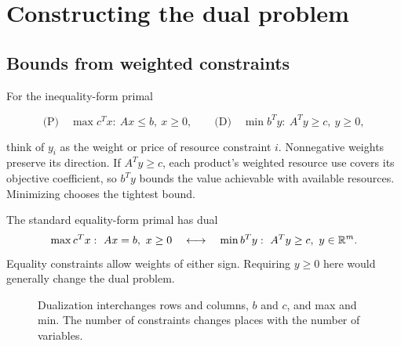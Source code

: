 \documentclass[11pt,a4paper]{article}
\begin{document}
\section{Constructing the dual problem}\label{sec:dual-rules}
\subsection{Bounds from weighted constraints}
For the inequality-form primal
\begin{lecturecore}
  \begin{equation}\label{eq:primal-dual}
    \text{(P)}\quad\max c^Tx:\ Ax\leq b,\ x\geq0,
    \qquad
    \text{(D)}\quad\min b^Ty:\ A^Ty\geq c,\ y\geq0,
  \end{equation}
\end{lecturecore}
think of $y_i$ as the weight or price of resource constraint $i$.
Nonnegative weights preserve its direction. If $A^Ty\geq c$, each product's
weighted resource use covers its objective coefficient, so $b^Ty$ bounds the
value achievable with available resources. Minimizing chooses the tightest bound.

The standard equality-form primal has dual
\begin{equation}\label{eq:standard-dual}
  \max c^Tx:\ Ax=b,\ x\geq0
  \quad\longleftrightarrow\quad
  \min b^Ty:\ A^Ty\geq c,\ y\in\mathbb{R}^m.
\end{equation}
Equality constraints allow weights of either sign. Requiring $y\geq0$ here
would generally change the dual problem.

\begin{figure}[H]
  \centering
  \caption{Dualization interchanges rows and columns, $b$ and $c$, and max and min.
    The number of constraints changes places with the number of variables.}
\end{figure}
\end{document}
